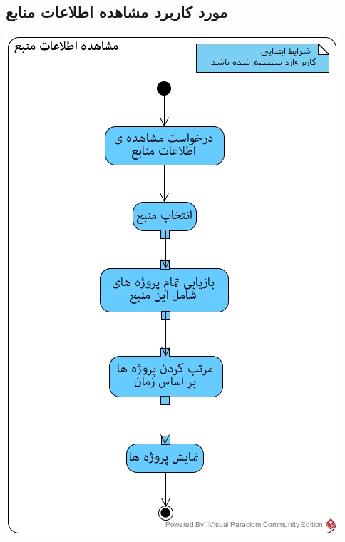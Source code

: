 \documentclass{article}
\begin{document}
\subsection*{مورد کاربرد مشاهده اطلاعات منابع}
\vspace{2cm}
\begin{center}
\includegraphics[width=\textwidth]{ActivityDiagrams/36.jpg}
\end{center}

\newpage
\vspace{2cm}
\end{document}
